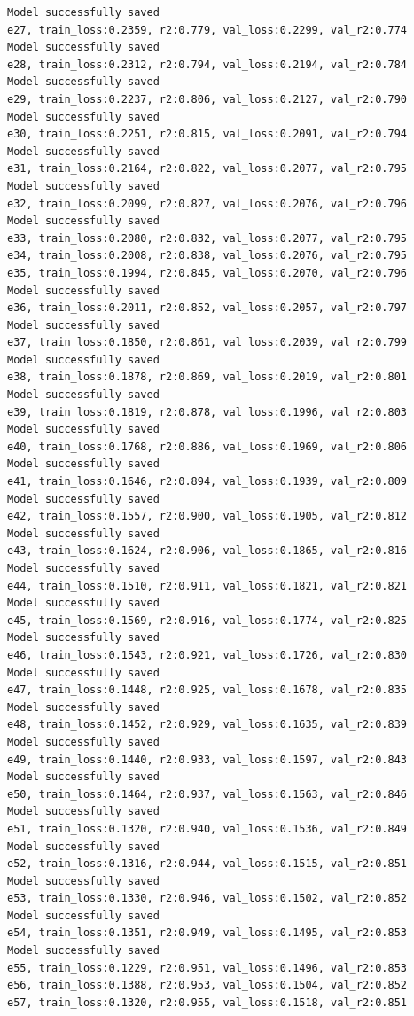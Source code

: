 \documentclass[a4paper, 12pt]{article}
\begin{document}
\begin{lstlisting}
Model successfully saved
e27, train_loss:0.2359, r2:0.779, val_loss:0.2299, val_r2:0.774
Model successfully saved
e28, train_loss:0.2312, r2:0.794, val_loss:0.2194, val_r2:0.784
Model successfully saved
e29, train_loss:0.2237, r2:0.806, val_loss:0.2127, val_r2:0.790
Model successfully saved
e30, train_loss:0.2251, r2:0.815, val_loss:0.2091, val_r2:0.794
Model successfully saved
e31, train_loss:0.2164, r2:0.822, val_loss:0.2077, val_r2:0.795
Model successfully saved
e32, train_loss:0.2099, r2:0.827, val_loss:0.2076, val_r2:0.796
Model successfully saved
e33, train_loss:0.2080, r2:0.832, val_loss:0.2077, val_r2:0.795
e34, train_loss:0.2008, r2:0.838, val_loss:0.2076, val_r2:0.795
e35, train_loss:0.1994, r2:0.845, val_loss:0.2070, val_r2:0.796
Model successfully saved
e36, train_loss:0.2011, r2:0.852, val_loss:0.2057, val_r2:0.797
Model successfully saved
e37, train_loss:0.1850, r2:0.861, val_loss:0.2039, val_r2:0.799
Model successfully saved
e38, train_loss:0.1878, r2:0.869, val_loss:0.2019, val_r2:0.801
Model successfully saved
e39, train_loss:0.1819, r2:0.878, val_loss:0.1996, val_r2:0.803
Model successfully saved
e40, train_loss:0.1768, r2:0.886, val_loss:0.1969, val_r2:0.806
Model successfully saved
e41, train_loss:0.1646, r2:0.894, val_loss:0.1939, val_r2:0.809
Model successfully saved
e42, train_loss:0.1557, r2:0.900, val_loss:0.1905, val_r2:0.812
Model successfully saved
e43, train_loss:0.1624, r2:0.906, val_loss:0.1865, val_r2:0.816
Model successfully saved
e44, train_loss:0.1510, r2:0.911, val_loss:0.1821, val_r2:0.821
Model successfully saved
e45, train_loss:0.1569, r2:0.916, val_loss:0.1774, val_r2:0.825
Model successfully saved
e46, train_loss:0.1543, r2:0.921, val_loss:0.1726, val_r2:0.830
Model successfully saved
e47, train_loss:0.1448, r2:0.925, val_loss:0.1678, val_r2:0.835
Model successfully saved
e48, train_loss:0.1452, r2:0.929, val_loss:0.1635, val_r2:0.839
Model successfully saved
e49, train_loss:0.1440, r2:0.933, val_loss:0.1597, val_r2:0.843
Model successfully saved
e50, train_loss:0.1464, r2:0.937, val_loss:0.1563, val_r2:0.846
Model successfully saved
e51, train_loss:0.1320, r2:0.940, val_loss:0.1536, val_r2:0.849
Model successfully saved
e52, train_loss:0.1316, r2:0.944, val_loss:0.1515, val_r2:0.851
Model successfully saved
e53, train_loss:0.1330, r2:0.946, val_loss:0.1502, val_r2:0.852
Model successfully saved
e54, train_loss:0.1351, r2:0.949, val_loss:0.1495, val_r2:0.853
Model successfully saved
e55, train_loss:0.1229, r2:0.951, val_loss:0.1496, val_r2:0.853
e56, train_loss:0.1388, r2:0.953, val_loss:0.1504, val_r2:0.852
e57, train_loss:0.1320, r2:0.955, val_loss:0.1518, val_r2:0.851

\end{lstlisting}
\end{document}
